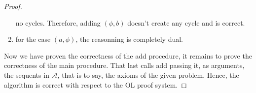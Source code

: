 \documentclass[a4paper, 11pt]{article}
\begin{document}
\begin{proof}
\begin{enumerate}
			    no cycles.
			    Therefore, adding $(\phi,b)$ doesn't create any cycle and is correct.
		    \item
			    for the case $(a,\phi)$, the reasonning is completely dual.
	    \end{enumerate}
	    Now we have proven the correctness of the \textsf{add} procedure, it remains to prove the
	    correctness of the main procedure. That last calls \textsf{add} passing it,
	    as arguments, the sequents in $\mathcal{A}$, that is to say, the axioms of the given problem.
	    Hence, the algorithm is correct with respect to the OL proof system.
    \end{proof}
\end{document}
